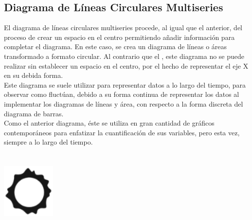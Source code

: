 \documentclass{article}\usepackage[]{graphicx}\usepackage[]{color}
\begin{document}
\subsection{Diagrama de L\'ineas Circulares Multiseries}
El diagrama de l\'ineas circulares multiseries procede, al igual que el anterior, del proceso de crear un espacio en el centro permitiendo a\~nadir informaci\'on para completar el diagrama. En este caso, se crea un diagrama de l\'ineas o \'areas transformado a formato circular. Al contrario que el , este diagrama no se puede realizar sin establecer un espacio en el centro, por el hecho de representar el eje X en su debida forma.~\\
Este diagrama se suele utilizar para representar datos a lo largo del tiempo, para observar como fluct\'uan, debido a su forma continua de representar los datos al implementar los diagramas de l\'ineas y \'area, con respecto a la forma discreta del diagrama de barras.~\\
Como el anterior diagrama, \'este se utiliza en gran cantidad de gr\'aficos contempor\'aneos para enfatizar la cuantificaci\'on de sus variables, pero esta vez, siempre a lo largo del tiempo.
~\\~\\~\\
\vbox{
    \centering
    \includegraphics[width=0.2\textwidth]{imag/flow}
}
\end{document}
